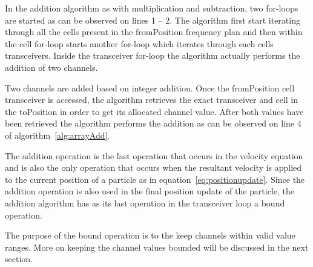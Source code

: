 In the addition algorithm as with multiplication and subtraction, two for-loops are started as can be observed on lines 1 -- 2. The algorithm first start iterating through all the cells present in the fromPosition frequency plan and then within the cell for-loop starts another for-loop which iterates through each cells transceivers. Inside the transceiver for-loop the algorithm actually performs the addition of two channels.

Two channels are added based on integer addition. Once the fromPosition cell transceiver is accessed, the algorithm retrieves the exact transceiver and cell in the toPosition in order to get its allocated channel value. After both values have been retrieved the algorithm performs the addition as can be observed on line 4 of algorithm~\ref{alg:arrayAdd}.

The addition operation is the last operation that occurs in the velocity equation and is also the only operation that occurs when the resultant velocity is applied to the current position of a particle as in equation~\ref{eq:positionupdate}. Since the addition operation is also used in the final position update of the particle, the addition algorithm has as its last operation in the transceiver loop a bound operation. 

The purpose of the bound operation is to the keep channels within valid value ranges. More on keeping the channel values bounded will be discussed in the next section.
